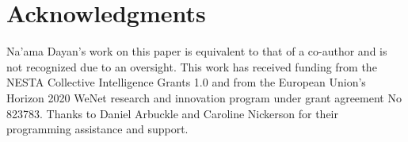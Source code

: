 \documentclass[letterpaper]{article} %
\begin{document}
\section*{Acknowledgments}
Na'ama Dayan's work on this paper is equivalent to that of a co-author and is not recognized due to an oversight. 
This work has received funding from the NESTA Collective Intelligence Grants 1.0 and from the European Union's Horizon 2020 WeNet research and innovation program under grant agreement No 823783. Thanks to Daniel Arbuckle  and Caroline Nickerson for their programming assistance and support.







\end{document}
